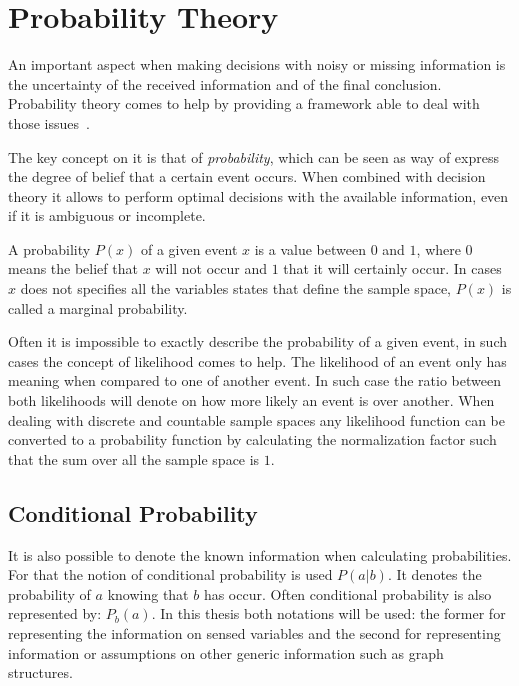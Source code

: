 \section{Probability Theory}
An important aspect when making decisions with noisy or missing information is
the uncertainty of the received information and of the final conclusion.
Probability theory comes to help by providing a framework able to deal with those
issues~\cite{bishop2006pattern}.

The key concept on it is that of \emph{probability}, which can be seen as way of
express the degree of belief that a certain event occurs.
When combined with decision theory it allows to perform optimal decisions with the
available information, even if it is ambiguous or incomplete.

A probability $P(x)$ of a given event $x$ is a value between $0$ and $1$, where $0$ means
the belief that $x$ will not occur and $1$ that it will certainly occur.
In cases $x$ does not specifies all the variables states that define the sample space, $P(x)$
is called a marginal probability. 

Often it is impossible to exactly describe the probability of a given event, in such cases
the concept of likelihood comes to help.
The likelihood of an event only has meaning when compared to one of another event.
In such case the ratio between both likelihoods will denote on how more likely an event is
over another.
When dealing with discrete and countable sample spaces any likelihood function can be converted
to a probability function by calculating the normalization factor such that the sum over all
the sample space is $1$.

\subsection{Conditional Probability}
It is also possible to denote the known information when calculating probabilities. For that
the notion of conditional probability is used $P(a|b)$. It denotes the probability of $a$
knowing that $b$ has occur. Often conditional probability is also represented by: $P_b(a)$.
In this thesis both notations will be used: the former for representing the information on
sensed variables and the second for representing information or assumptions on other generic
information such as graph structures.

